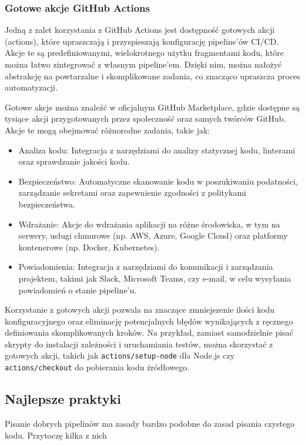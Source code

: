 \documentclass{article}
\begin{document}
\subsubsection{Gotowe akcje GitHub Actions}

Jedną z zalet korzystania z GitHub Actions jest dostępność gotowych akcji (actions), które upraszczają i przyspieszają konfigurację pipeline'ów CI/CD. Akcje te są predefiniowanymi, wielokrotnego użytku fragmentami kodu, które można łatwo zintegrować z własnym pipeline'em. Dzięki nim, można nałożyć abstrakcję na powtarzalne i skomplikowane zadania, co znacząco upraszcza proces automatyzacji.

Gotowe akcje można znaleźć w oficjalnym GitHub Marketplace, gdzie dostępne są tysiące akcji przygotowanych przez społeczność oraz samych twórców GitHub. Akcje te mogą obejmować różnorodne zadania, takie jak:

\begin{itemize}
\item Analiza kodu: Integracja z narzędziami do analizy statycznej kodu, linterami oraz sprawdzanie jakości kodu.
\item Bezpieczeństwo: Automatyczne skanowanie kodu w poszukiwaniu podatności, zarządzanie sekretami oraz zapewnienie zgodności z politykami bezpieczeństwa.
\item Wdrażanie: Akcje do wdrażania aplikacji na różne środowiska, w tym na serwery, usługi chmurowe (np. AWS, Azure, Google Cloud) oraz platformy kontenerowe (np. Docker, Kubernetes).
\item Powiadomienia: Integracja z narzędziami do komunikacji i zarządzania projektem, takimi jak Slack, Microsoft Teams, czy e-mail, w celu wysyłania powiadomień o stanie pipeline'u.
\end{itemize}

Korzystanie z gotowych akcji pozwala na znaczące zmniejszenie ilości kodu konfiguracyjnego oraz eliminację potencjalnych błędów wynikających z ręcznego definiowania skomplikowanych kroków. Na przykład, zamiast samodzielnie pisać skrypty do instalacji zależności i uruchamiania testów, można skorzystać z gotowych akcji, takich jak \lstinline|actions/setup-node| dla Node.js czy \lstinline|actions/checkout| do pobierania kodu źródłowego.

\subsection{Najlepsze praktyki}
Pisanie dobrych pipelinów ma zasady bardzo podobne do zasad pisania czystego kodu. Przytoczę kilka z nich
\end{document}
